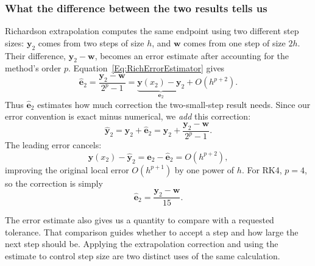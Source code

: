\subsubsection{What the difference between the two results tells us}
Richardson extrapolation computes the same endpoint using two different step
sizes: $\mathbf y_2$ comes from two steps of size $h$, and $\mathbf w$ comes
from one step of size $2h$. Their difference, $\mathbf y_2-\mathbf w$,
becomes an error estimate after accounting for the method's order $p$.
Equation~\ref{Eq:RichErrorEstimator} gives
\[
 \widehat{\mathbf e}_2
 =\frac{\mathbf y_2-\mathbf w}{2^p-1}
 =\underbrace{\mathbf y(x_2)-\mathbf y_2}_{\mathbf e_2}
   +O(h^{p+2}).
\]
Thus $\widehat{\mathbf e}_2$ estimates how much correction the two-small-step
result needs. Since our error convention is exact minus numerical, we
\emph{add} this correction:
\[
 \widehat{\mathbf y}_2
 =\mathbf y_2+\widehat{\mathbf e}_2
 =\mathbf y_2+\frac{\mathbf y_2-\mathbf w}{2^p-1}.
\]
The leading error cancels:
\[
 \mathbf y(x_2)-\widehat{\mathbf y}_2
 =\mathbf e_2-\widehat{\mathbf e}_2
 =O(h^{p+2}),
\]
improving the original local error $O(h^{p+1})$ by one power of $h$.
For RK4, $p=4$, so the correction is simply
\[
 \widehat{\mathbf e}_2=\frac{\mathbf y_2-\mathbf w}{15}.
\]

The error estimate also gives us a quantity to compare with a requested
tolerance. That comparison guides whether to accept a step and how large the
next step should be. Applying the extrapolation correction and using the
estimate to control step size are two distinct uses of the same calculation.
